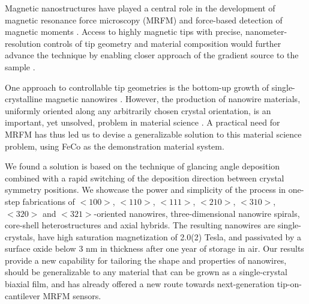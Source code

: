Magnetic nanostructures have played a central role in the development of magnetic resonance force microscopy (MRFM) \cite{Mamin_2007,Poggio_2007,Nichol_2012} and force-based detection of magnetic moments \cite{Tao_2016}.  Access to highly magnetic tips with precise, nanometer-resolution controls of tip geometry and material composition would further advance the technique by enabling closer approach of the gradient source to the sample \cite{Kuehn_2006,Overweg_2015}.
 
One approach to controllable tip geometries is the bottom-up growth of single-crystalline magnetic nanowires \cite{Chan_2010}.  However, the production of nanowire materials, uniformly oriented along any arbitrarily chosen crystal orientation, is an important, yet unsolved, problem in material science \cite{Dasgupta_2014}. A practical need for MRFM has thus led us to devise a generalizable solution to this material science problem, using FeCo as the demonstration material system. 

We found a solution is based on the technique of glancing angle deposition \cite{Hawkeye_2007} combined with a rapid switching of the deposition direction between crystal symmetry positions.  We showcase the power and simplicity of the process in one-step fabrications of $<1 0 0>$, $<1 1 0>$, $<1 1 1>$, $<2 1 0>$, $<3 1 0>$, $<3 2 0>$ and $<3 2 1>$-oriented nanowires, three-dimensional nanowire spirals, core-shell heterostructures and axial hybrids.  The resulting nanowires are single-crystals, have high saturation magnetization of 2.0(2) Tesla, and passivated by a surface oxide below 3 nm in thickness after one year of storage in air.  Our results provide a new capability for tailoring the shape and properties of nanowires, should be generalizable to any material that can be grown as a single-crystal biaxial film, and has already offered a new route towards next-generation tip-on-cantilever MRFM sensors.
